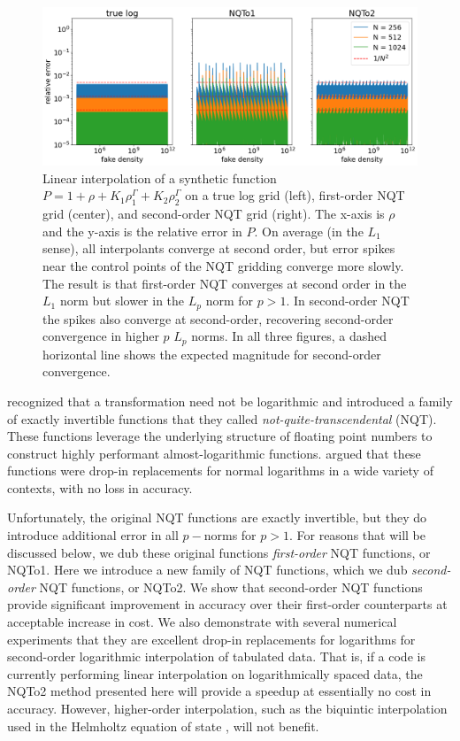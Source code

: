 \documentclass[linenumbers,twocolumn]{aastex631}
\begin{document}
\begin{figure}[t!]
    \centering
    \includegraphics[width=0.95\linewidth]{figures/nqt_convergence.png}
    \caption{Linear interpolation of a synthetic function $P = 1 + \rho + K_1 \rho^\Gamma_1 + K_2 \rho^\Gamma_2$ on a true log grid (left), first-order NQT grid (center), and second-order NQT grid (right). The x-axis is $\rho$ and the y-axis is the relative error in $P$. On average (in the $L_1$ sense), all interpolants converge at second order, but error spikes near the control points of the NQT gridding converge more slowly. The result is that first-order NQT converges at second order in the $L_1$ norm but slower in the $L_p$ norm for $p>1$. In second-order NQT the spikes also converge at second-order, recovering second-order convergence in higher $p$ $L_p$ norms. In all three figures, a dashed horizontal line shows the expected magnitude for second-order convergence.}
    \label{fig:faketable}  
\end{figure}

\citet{NQTo1} recognized that a transformation need not be logarithmic and introduced a family of exactly invertible functions that they called \textit{not-quite-transcendental} (NQT). These functions leverage the underlying structure of floating point numbers to construct highly performant almost-logarithmic functions. \citet{NQTo1} argued that these functions were drop-in replacements for normal logarithms in a wide variety of contexts, with no loss in accuracy. 

Unfortunately, the original NQT functions are exactly invertible, but they do introduce additional error in all $p-$norms for $p > 1$. For reasons that will be discussed below, we dub these original functions \textit{first-order} NQT functions, or NQTo1. Here we introduce a new family of NQT functions, which we dub \textit{second-order} NQT functions, or NQTo2. We show that second-order NQT functions provide significant improvement in accuracy over their first-order counterparts at acceptable increase in cost. We also demonstrate with several numerical experiments that they are excellent drop-in replacements for logarithms for second-order logarithmic interpolation of tabulated data. That is, if a code is currently performing linear interpolation on logarithmically spaced data, the NQTo2 method presented here will provide a speedup at essentially no cost in accuracy. However, higher-order interpolation, such as the biquintic interpolation used in the Helmholtz equation of state \citep{HelmEOS}, will not benefit.
\end{document}
